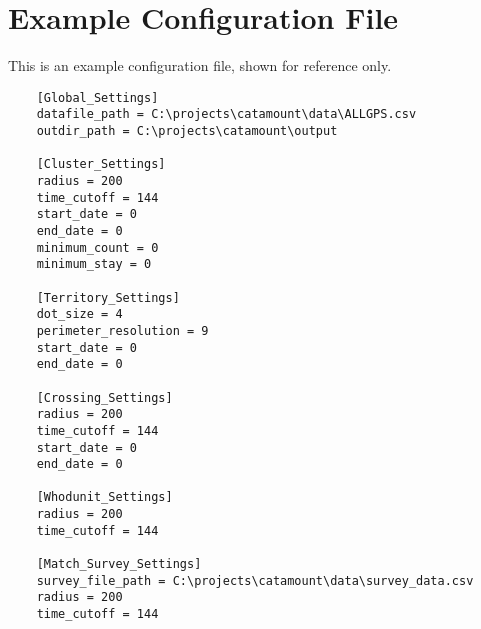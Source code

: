 \chapter{Example Configuration File}
\hypertarget{example-config}{}

This is an example configuration file, shown for reference only.

\begin{verbatim}
    [Global_Settings]
    datafile_path = C:\projects\catamount\data\ALLGPS.csv
    outdir_path = C:\projects\catamount\output
     
    [Cluster_Settings]
    radius = 200
    time_cutoff = 144
    start_date = 0
    end_date = 0
    minimum_count = 0
    minimum_stay = 0
     
    [Territory_Settings]
    dot_size = 4
    perimeter_resolution = 9
    start_date = 0
    end_date = 0
     
    [Crossing_Settings]
    radius = 200
    time_cutoff = 144
    start_date = 0
    end_date = 0

    [Whodunit_Settings]
    radius = 200
    time_cutoff = 144

    [Match_Survey_Settings]
    survey_file_path = C:\projects\catamount\data\survey_data.csv
    radius = 200
    time_cutoff = 144

\end{verbatim}
